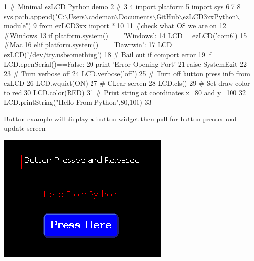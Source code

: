 \begin{DoxyCodeInclude}
1 \textcolor{comment}{# Minimal ezLCD Python demo}
2 \textcolor{comment}{#}
3 
4 \textcolor{keyword}{import} platform
5 \textcolor{keyword}{import} sys
6 
7 
8 sys.path.append(\textcolor{stringliteral}{"C:\(\backslash\)Users\(\backslash\)codeman\(\backslash\)Documents\(\backslash\)GitHub\(\backslash\)ezLCD3xxPython\(\backslash\)module"}) 
9 \textcolor{keyword}{from} ezLCD3xx \textcolor{keyword}{import} *
10 
11 \textcolor{comment}{#check what OS we are on}
12 \textcolor{comment}{#Windows}
13 \textcolor{keywordflow}{if} platform.system() == \textcolor{stringliteral}{'Windows'}:
14     LCD = ezLCD(\textcolor{stringliteral}{'com6'}) 
15 \textcolor{comment}{#Mac}
16 \textcolor{keywordflow}{elif} platform.system() == \textcolor{stringliteral}{'Dawrwin'}:
17     LCD = ezLCD(\textcolor{stringliteral}{'/dev/tty.usbsomething'})
18 \textcolor{comment}{# Bail out if comport error}
19 \textcolor{keywordflow}{if} LCD.openSerial()==\textcolor{keyword}{False}:
20     \textcolor{keywordflow}{print} \textcolor{stringliteral}{'Error Opening Port'}
21     \textcolor{keywordflow}{raise} SystemExit
22 
23 \textcolor{comment}{# Turn verbose off }
24 LCD.verbose(\textcolor{stringliteral}{'off'})
25 \textcolor{comment}{# Turn off button press info from ezLCD}
26 LCD.wquiet(ON)
27 \textcolor{comment}{# CLear screen}
28 LCD.cls()
29 \textcolor{comment}{# Set draw color to red}
30 LCD.color(RED)
31 \textcolor{comment}{# Print string at coordinates x=80 and y=100}
32 LCD.printString(\textcolor{stringliteral}{"Hello From Python"},80,100)
33 
\end{DoxyCodeInclude}
 Button example will display a button widget then poll for button presses and update screen \par
  
\begin{DoxyImageNoCaption}
  \mbox{\includegraphics{button.png}}
\end{DoxyImageNoCaption}
 
